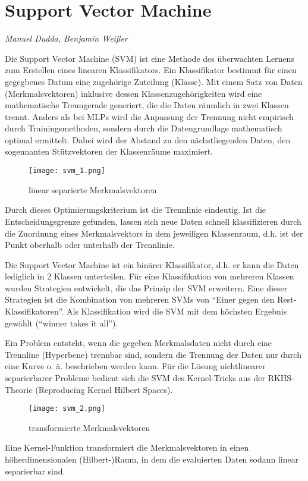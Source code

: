 \section{Support Vector Machine}
\textit{Manuel Dudda, Benjamin Weißer}

Die Support Vector Machine (SVM) ist eine Methode des überwachten Lernens zum Erstellen eines linearen Klassifikators. Ein Klassifikator bestimmt für einen gegegbenes Datum eine zugehörige Zuteilung (Klasse). Mit einem Satz von Daten (Merkmalsvektoren) inklusive dessen Klassenzugehörigkeiten wird eine mathematische Trenngerade generiert, die die Daten räumlich in zwei Klassen trennt. Anders als bei MLPs wird die Anpassung der Trennung nicht empirisch durch Trainingsmethoden, sondern durch die Datengrundlage mathematisch optimal ermittelt. Dabei wird der Abstand zu den nächstliegenden Daten, den sogennanten Stützvektoren der Klassenräume maximiert.

\begin{wrapfigure}{r}{0.4\textwidth}
	\vspace{-30pt}
	\begin{center}
		 \texttt{[image: svm\_1.png]}
	\end{center}
	\vspace{-15pt}
	\caption{linear separierte Merkmalsvektoren}
	\vspace{-15pt}
\end{wrapfigure}

Durch dieses Optimierungskriterium ist die Trennlinie eindeutig. Ist die Entscheidungsgrenze gefunden, lassen sich neue Daten schnell klassifizieren durch die Zuordnung eines Merkmalsvektors in dem jeweiligen Klassenraum, d.h. ist der Punkt oberhalb oder unterhalb der Trennlinie.

Die Support Vector Machine ist ein binärer Klassifikator, d.h. er kann die Daten lediglich in 2 Klassen unterteilen. Für eine Klassifikation von mehreren Klassen wurden Strategien entwickelt, die das Prinzip der SVM erweitern. Eine dieser Strategien ist die Kombination von mehreren SVMs von “Einer gegen den Rest-Klassifikatoren”. Als Klassifikation wird die SVM mit dem höchsten Ergebnis gewählt (“winner takes it all”).

Ein Problem entsteht, wenn die gegeben Merkmalsdaten nicht durch eine Trennline (Hyperbene) trennbar sind, sondern die Trennung der Daten nur durch eine Kurve o. ä. beschrieben werden kann. Für die Lösung nichtlinearer separierbarer Probleme bedient sich die SVM des Kernel-Tricks aus der RKHS-Theorie (Reproducing Kernel Hilbert Spaces). 
\begin{wrapfigure}{l}{0.45\textwidth}
	\vspace{-30pt}
	\begin{center}
	    \texttt{[image: svm\_2.png]}
	\end{center}
	\vspace{-15pt}
	\caption{transformierte Merkmalsvektoren}
		\vspace{-65pt}
\end{wrapfigure}
Eine Kernel-Funktion transformiert die Merkmalsvektoren in einen höherdimensionalen (Hilbert-)Raum, in dem die evaluierten Daten sodann linear separierbar sind.


